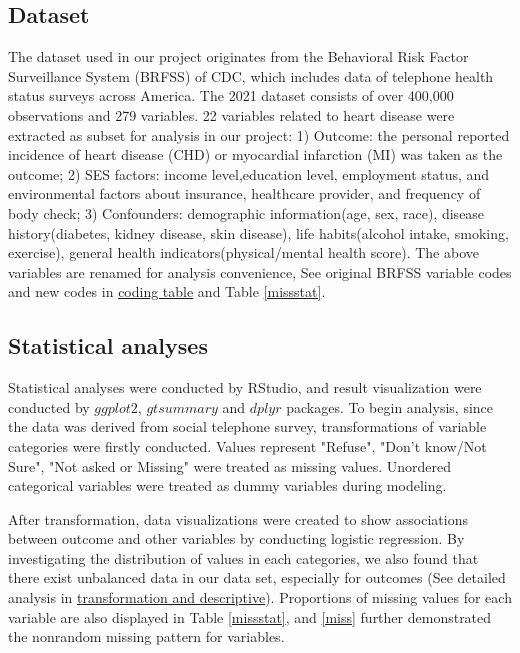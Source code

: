 \documentclass[11pt]{article}
\begin{document}
\subsection{Dataset}
The dataset used in our project originates from the Behavioral Risk Factor Surveillance System (BRFSS) of CDC, which includes data of telephone health status surveys across America. The 2021 dataset consists of over 400,000 observations and 279 variables. 22 variables related to heart disease were extracted as subset for analysis in our project: 1) Outcome: the personal reported incidence of heart disease (CHD) or myocardial infarction (MI) was taken as the outcome; 2) SES factors: income level,education level, employment status, and environmental factors about insurance, healthcare provider, and frequency of body check; 3) Confounders: demographic information(age, sex, race), disease history(diabetes, kidney disease, skin disease), life habits(alcohol intake, smoking, exercise), general health indicators(physical/mental health score). The above variables are renamed for analysis convenience, See original BRFSS variable codes and new codes in \href{https://github.com/elizabethjchoe/biostat625-group5-project}{coding table} and Table \ref{missstat}.

\subsection{Statistical analyses}
Statistical analyses were conducted by RStudio, and result visualization were conducted by $ggplot2$, $gtsummary$ and $dplyr$ packages. To begin analysis, since the data was derived from social telephone survey, transformations of variable categories were firstly conducted. Values represent "Refuse", "Don’t know/Not Sure", "Not asked or Missing" were treated as missing values. Unordered categorical variables were treated as dummy variables during modeling. 

After transformation, data visualizations were created to show associations between outcome and other variables by conducting logistic regression. By investigating the distribution of values in each categories, we also found that there exist unbalanced data in our data set, especially for outcomes (See detailed analysis in  \href{liz/Transformation and descriptive.Rmd}{transformation and descriptive}). Proportions of missing values for each variable are also displayed in Table \ref{missstat}, and \ref{miss} further demonstrated the nonrandom missing pattern for variables.
\end{document}
